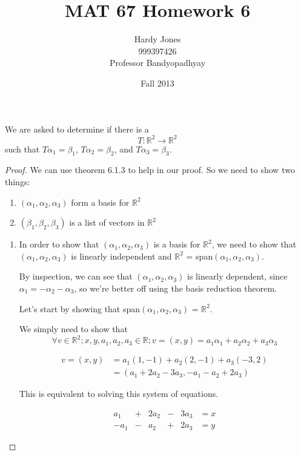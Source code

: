 \documentclass[12pt,letterpaper]{article}
\title{MAT 67 Homework 6\vspace{-2ex}}
\author{Hardy Jones\\
        999397426\\
        Professor Bandyopadhyay\vspace{-2ex}}
\date{Fall 2013}
\begin{document}
  \maketitle

  We are asked to determine if there is a
  \[T: \mathbb{R}^2 \rightarrow \mathbb{R}^2\]
  such that $T\alpha_1 = \beta_1$, $T\alpha_2 = \beta_2$, and $T\alpha_3 = \beta_3$.

  \begin{proof}
    We can use theorem 6.1.3 to help in our proof.
    So we need to show two things:

    \begin{enumerate}
      \item $(\alpha_1, \alpha_2, \alpha_3)$ form a basis for $\mathbb{R}^2$
      \item $(\beta_1, \beta_2, \beta_3)$ is a list of vectors in $\mathbb{R}^2$
    \end{enumerate}

    \begin{enumerate}
      \item
        In order to show that $(\alpha_1, \alpha_2, \alpha_3)$ is a basis for $\mathbb{R}^2$,
        we need to show that $(\alpha_1, \alpha_2, \alpha_3)$ is linearly independent
        and $\mathbb{R}^2$ = span$(\alpha_1, \alpha_2, \alpha_3)$.

        By inspection, we can see that $(\alpha_1, \alpha_2, \alpha_3)$ is linearly dependent,
        since $\alpha_1 = -\alpha_2 - \alpha_3$, so we're better off using the basis reduction theorem.

        Let's start by showing that span$(\alpha_1, \alpha_2, \alpha_3)$ = $\mathbb{R}^2$.

        We simply need to show that
        \[\forall v \in \mathbb{R}^2; x, y, a_1, a_2, a_3 \in \mathbb{R}; v = (x, y) = a_1\alpha_1 + a_2\alpha_2 + a_3\alpha_3\]

        \begin{align*}
          v = (x, y) &= a_1(1, -1) + a_2(2, -1) + a_3(-3, 2) \\
          &= (a_1 + 2a_2 -3a_3, -a_1 - a_2 + 2a_3)
        \end{align*}

        This is equivalent to solving this system of equations.

        \begin{align*}
          a_1 & + & 2a_2 & - & 3a_3 & = x \\
          -a_1 & - & a_2 & + & 2a_3 & = y
        \end{align*}


\end{enumerate}
\end{proof}
\end{document}
